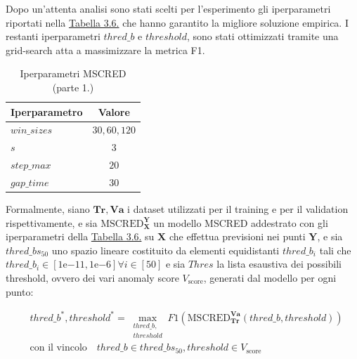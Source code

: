     Dopo un'attenta analisi sono stati scelti per l'esperimento gli iperparametri riportati nella 
    \hyperref[tab:mscred-iperparams]{Tabella 3.6.} che hanno garantito la migliore soluzione
    empirica. I restanti iperparametri $thred\_b$ e $threshold$, sono stati ottimizzati tramite una grid-search atta 
    a massimizzare la metrica F1.

    \begin{table}[H]
        \centering
        \caption{Iperparametri MSCRED (parte 1.)}
        \begin{tabular}{lc}
            \toprule
            \textbf{Iperparametro} & \textbf{Valore} \\
            \toprule
            $win\_sizes$ & $30, 60, 120$ \\
            $s$ & $3$ \\
            $step\_max$ & $20$ \\
            $gap\_time$ & $30$ \\
            \bottomrule
        \end{tabular}
        \label{tab:mscred-iperparams}
    \end{table}

    Formalmente, siano $\mathbf{Tr}, \mathbf{Va}$ i dataset utilizzati per il training e
    per il validation rispettivamente, e sia $\text{MSCRED}_\mathbf{X}^\mathbf{Y}$ un modello MSCRED addestrato con gli iperparametri 
    della \hyperref[tab:mscred-iperparams]{Tabella 3.6.} su $\mathbf{X}$ che effettua previsioni nei punti $\mathbf{Y}$, 
    e sia $thred\_bs_{50}$ uno spazio lineare costituito da elementi equidistanti $thred\_b_i$ tali che $thred\_b_i \in 
    [1\mathrm{e}{-11}, 1\mathrm{e}{-6}] \forall i \in [50]$ e sia 
    $Thres$ la lista esaustiva dei possibili threshold, ovvero dei vari anomaly score $V_{\text{score}}$, 
    generati dal modello per ogni punto:

    \begin{equation}
        \label{eq:mscred-problem}
        \begin{aligned}
            & thred\_b^*, threshold^* = \max_{\substack{thred\_b, \\ threshold}} F1(\text{MSCRED}_\mathbf{Tr}^\mathbf{Va}(thred\_b, threshold)) \\
            & \text{con il vincolo} \quad thred\_b \in thred\_bs_{50}, threshold \in V_{\text{score}}
        \end{aligned}
    \end{equation}

